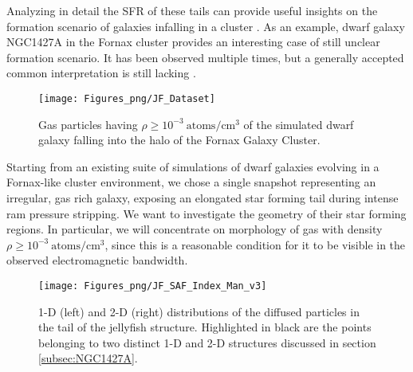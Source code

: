 Analyzing in detail the SFR of these tails can provide useful insights on the formation scenario of galaxies infalling in a cluster \cite{Ebeling2013}.
As an example, dwarf galaxy NGC1427A in the Fornax cluster provides an interesting case of still unclear formation scenario.
It has been observed multiple times, but a generally accepted common interpretation is still lacking \cite{Lee-Waddell2018, Mora2015}.
\begin{figure}
    \centering
    \texttt{[image: Figures\_png/JF\_Dataset]}
    \caption{Gas particles having $\rho \ge 10^{-3} ~ \mathrm{atoms/cm^3}$ of the simulated dwarf galaxy falling into the halo of the Fornax Galaxy Cluster.}
    \label{fig:JF_Dataset}
\end{figure}
Starting from an existing suite of simulations of dwarf galaxies evolving in a Fornax-like cluster environment, we chose a single snapshot representing an irregular, gas rich galaxy, exposing an elongated star forming tail during intense ram pressure stripping. We want to investigate the geometry of their star forming regions.
In particular, we will concentrate on morphology of gas with density $\rho \ge 10^{-3} ~ \mathrm{atoms/cm^3}$, %
since this is a reasonable condition for it to be visible in the observed electromagnetic bandwidth.
\begin{figure}[ht]
    \centering
    \texttt{[image: Figures\_png/JF\_SAF\_Index\_Man\_v3]}
    \caption{1-D (left) and 2-D (right) distributions of the diffused particles in the tail of the jellyfish structure.
    Highlighted in black are the points belonging to two distinct 1-D and 2-D structures discussed in section \ref{subsec:NGC1427A}.}
    \label{fig:JF_Res}
\end{figure}
